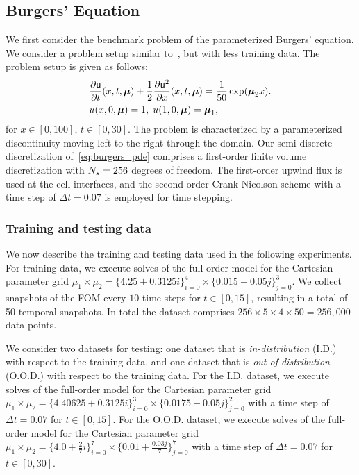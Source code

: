 \documentclass[3p,computermodern,10pt]{elsarticle}
\begin{document}
\subsection{Burgers' Equation}
We first consider the benchmark problem of the parameterized Burgers' equation. We consider a problem setup similar to~\cite{LEE2020108973}, but with less training data. The problem setup is given as follows: 
\begin{align}\label{eq:burgers_pde}
&\frac{\partial \mathsf{u}}{\partial t}(x,t,\boldsymbol \mu) + \frac{1}{2} \frac{\partial \mathsf{u}^2}{\partial x}(x,t,\boldsymbol \mu) = \frac{1}{50} \exp(\boldsymbol \mu_2 x). \\
&u(x,0,\boldsymbol \mu) = 1, \; u(1,0,\boldsymbol \mu) = \boldsymbol \mu_1,
\end{align}
for $x \in [0,100]$, $t \in [0,30]$. %
The problem is characterized by a parameterized discontinuity moving left to the right through the domain. Our semi-discrete discretization of~\eqref{eq:burgers_pde} comprises a first-order finite volume discretization with $N_s=256$ degrees of freedom. The first-order upwind flux is used at the cell interfaces, and the second-order Crank-Nicolson scheme with a time step of $\Delta t = 0.07$ is employed for time stepping.

\subsubsection{Training and testing data}
We now describe the training and testing data used in the following experiments. For training data, we execute solves of the full-order model for the Cartesian parameter grid $\mu_1 \times \mu_2 = \{ 4.25 + 0.3125 i \}_{i=0}^4 \times \{ 0.015 + 0.05 j \}_{j=0}^3$. We collect snapshots of the FOM every $10$ time steps for $t \in [0,15]$, resulting in a total of 50 temporal snapshots. In total the dataset comprises $256 \times 5 \times 4 \times 50 = 256,000$ data points.

We consider two datasets for testing: one dataset that is \textit{in-distribution } (I.D.) with respect to the training data, and one dataset that is \textit{out-of-distribution} (O.O.D.) with respect to the training data. For the I.D. dataset, we execute solves of the full-order model for the Cartesian parameter grid $\mu_1 \times \mu_2 = \{4.40625 + 0.3125 i \}_{i=0}^3 \times \{ 0.0175 + 0.05 j \}_{j=0}^2$ with a time step of $\Delta t = 0.07$ for $t \in [0,15]$. For the O.O.D. dataset, we execute solves of the full-order model for the Cartesian parameter grid $\mu_1 \times \mu_2 = \{4.0 + \frac{2}{7} i \}_{i=0}^7 \times \{ 0.01 + \frac{0.03 j}{7} \}_{j=0}^7$ with a time step of $\Delta t = 0.07$ for $t \in [0,30]$. 
\end{document}
